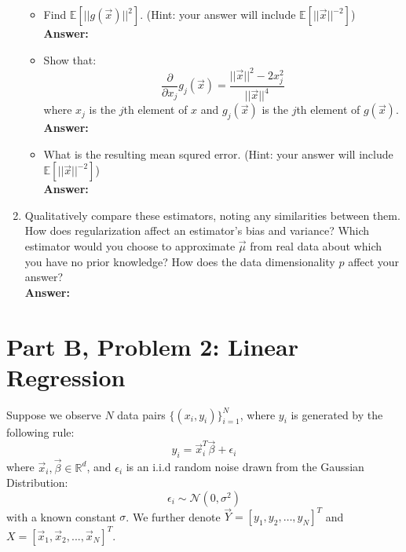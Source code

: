 \documentclass{article}
\begin{document}
\begin{enumerate}
\begin{itemize}
		\item Find $\mathbb{E}[||g(\vec{x})||^2]$. (Hint: your answer will include $\mathbb{E}[||\vec{x}||^{-2}]$)
		\\\textbf{Answer:}
		
		\item Show that:
		$$\frac{\partial}{\partial x_j}g_j(\vec{x}) = \frac{||\vec{x}||^2-2x_j^2}{||\vec{x}||^4}$$
		where $x_j$ is the $j$th element of $x$ and $g_j(\vec{x})$ is the $j$th element of $g(\vec{x})$.
		\\\textbf{Answer:}
		
		\item What is the resulting mean squred error. (Hint: your answer will include $\mathbb{E}[||\vec{x}||^{-2}]$)
		\\\textbf{Answer:}
		
	\end{itemize}

	\item Qualitatively compare these estimators, noting any similarities between them. How does regularization affect an estimator's bias and variance? Which estimator would you choose to approximate $\vec{\mu}$ from real data about which you have no prior knowledge? How does the data dimensionality $p$ affect your answer?
	\\\textbf{Answer:}
	
\end{enumerate}

\newpage

\section*{Part B, Problem 2: Linear Regression}
Suppose we observe $N$ data pairs $\{(x_i,y_i)\}_{i=1}^N$, where $y_i$ is generated by the following rule:
$$y_i=\vec{x}_i^T \vec{\beta} + \epsilon_i$$
where $\vec{x}_i,\vec{\beta}\in \mathbb{R}^d$, and $\epsilon_i$ is an i.i.d random noise drawn from the Gaussian Distribution:
$$\epsilon_i \sim \mathcal{N}(0,\sigma^2)$$
with a known constant $\sigma$. We further denote $\vec{Y}=[y_1,y_2,\dots,y_N]^T$ and $X=[\vec{x}_1,\vec{x}_2,...,\vec{x}_N]^T$.
\end{document}
